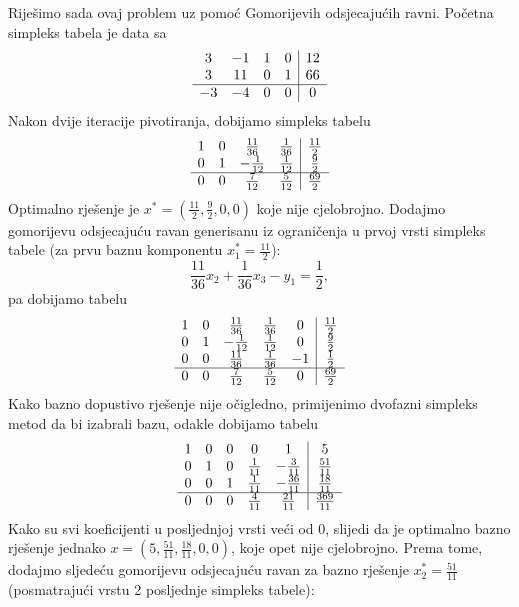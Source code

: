 \documentclass[a4paper, utf8, 11pt, colorlinks]{book}
\begin{document}
Riješimo sada ovaj problem uz pomoć Gomorijevih odsjecajućih ravni. 
Početna simpleks tabela je data sa 
$$\begin{array}{ccc c| c}
    3  & -1 & 1 &  0  & 12  \\
    3  & 11 & 0 &  1  & 66 \\ \hline
   -3  & -4 & 0 &  0  & 0
\end{array}$$
Nakon dvije iteracije pivotiranja, dobijamo simpleks tabelu 
$$\begin{array}{ccc c| c}
1 & 0 &  \frac{11}{36}   &  \frac{1}{36}  &  \frac{11}{2} \\
0 & 1 &  -\frac{1}{12}  &  \frac{1}{12}  &  \frac{9}{2}   \\ \hline
0 & 0 &  \frac{7}{12}   &  \frac{5}{12}  &  \frac{69}{2}
\end{array} $$
Optimalno rješenje je $x^* = (\frac{11}{2}, \frac{9}{2}, 0, 0)$ koje nije cjelobrojno. Dodajmo gomorijevu odsjecajuću ravan generisanu iz ograničenja u prvoj vrsti simpleks tabele (za prvu baznu komponentu $x_1^* = \frac{11}{2}$):
$$  \frac{11}{36} x_2 + \frac{1}{36} x_3 - y_1 = \frac{1}{2},$$
pa dobijamo tabelu 
$$\begin{array}{ccccc| c}
1 &  0 &   \frac{11}{36}  & \frac{1}{36}   &  0 & \frac{11}{2} \\
0 &  1 &   -\frac{1}{12}  & \frac{1}{12}   &  0 & \frac{9}{2} \\
0 &  0 &  \frac{11}{36}   &  \frac{1}{36}  & -1 & \frac{1}{2} \\ \hline
0 & 0  &  \frac{7}{12}    & \frac{5}{12}   &  0 & \frac{69}{2}
\end{array} $$
Kako bazno dopustivo rješenje nije očigledno, primijenimo dvofazni simpleks metod da bi izabrali bazu, odakle dobijamo tabelu 
$$\begin{array}{ccccc| c}
1   &   0       &   0   &   0             & 1              & 5 \\
0   &   1       &   0   &   \frac{1}{11}  & -\frac{3}{11}  & \frac{51}{11} \\
0   &   0       &   1   &   \frac{1}{11}  & -\frac{36}{11} &  \frac{18}{11} \\ \hline
0   &   0       &   0   &   \frac{4}{11}  & \frac{21}{11}  &  \frac{369}{11} \\
\end{array} $$
Kako su svi koeficijenti u posljednjoj vrsti veći od 0, slijedi da je optimalno bazno rješenje jednako $x=(5, \frac{51}{11}, \frac{18}{11}, 0, 0)$, koje opet nije cjelobrojno. 
 Prema tome, dodajmo sljedeću gomorijevu odsjecajuću ravan za bazno rješenje $x^*_2 = \frac{51}{11}$ (posmatrajući vrstu 2 posljednje simpleks tabele):
 
\end{document}
